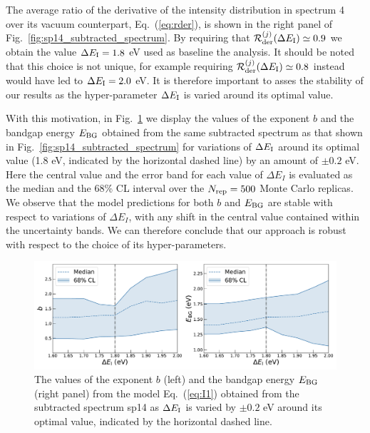 The average ratio of the derivative of the intensity
distribution in spectrum 4 over its vacuum counterpart, Eq.~(\ref{eq:rder}), is shown
in the right panel of  Fig.~\ref{fig:sp14_subtracted_spectrum}. 
%
By requiring that $\mathcal{R}^{(j)}_{\rm der}(\Delta E_{\rm I})\simeq 0.9$ we obtain
the value $\Delta E_{\rm I}=1.8$ eV used as baseline the analysis.
%
It should be noted that this choice is not unique, for example requiring
$\mathcal{R}^{(j)}_{\rm der}(\Delta E_{\rm I})\simeq 0.8$ instead would have led
to $\Delta E_{\rm I}=2.0$ eV.
%
It is therefore important to asses the stability of our results as the hyper-parameter $\Delta E_{\rm I}$
is varied around its optimal value.

With this motivation, in Fig.~\ref{fig:bvalues_sampleA} we display the
values of the exponent $b$
and the bandgap energy $E_{\rm BG}$ 
obtained from the same subtracted spectrum as that shown in
Fig.~\ref{fig:sp14_subtracted_spectrum} for variations of $\Delta E_{\rm I}$ 
around its optimal value (1.8 eV, indicated by the horizontal dashed line) by an amount
of $\pm 0.2$ eV.
%
Here the central value and the error band for each value of $\Delta E_I$ is evaluated
as the median and the 68\% CL interval over the $N_{\rm rep}=500$ Monte Carlo replicas.
%
We observe that the model predictions for both $b$ and $E_{\rm BG}$ are stable with respect
to variations of $\Delta E_I$, with any shift in the central value contained within the
uncertainty bands.
%
We can therefore conclude that our approach is robust with respect to the choice of its
hyper-parameters.

\begin{figure}[t]
\begin{centering}
  \includegraphics[width=0.99\linewidth]{plots/Stability_plots_sp14.pdf} 
  \caption{\small The values of the exponent $b$ (left)
    and the bandgap energy $E_{\rm BG}$ (right panel) from the model Eq.~(\ref{eq:I1})
    obtained from the subtracted spectrum sp14 as $\Delta E_{\rm I}$ is varied by $\pm 0.2$ eV
    around its optimal value, indicated by the horizontal dashed line.
  }
\label{fig:bvalues_sampleA}
\end{centering}
\end{figure}

